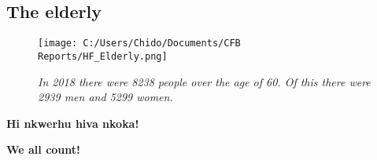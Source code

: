 \documentclass[
]{article}
\begin{document}
\begin{row}
\begin{col-md-4}
\hypertarget{the-elderly}{%
\subsection{The elderly}\label{the-elderly}}

\begin{figure}
\centering
\texttt{[image: C:/Users/Chido/Documents/CFB Reports/HF\_Elderly.png]}
\caption{\emph{In 2018 there were 8238 people over the age of 60. Of
this there were 2939 men and 5299 women.}}
\end{figure}

\end{col-md-4}

\end{row}

\textbf{Hi nkwerhu hiva nkoka!}

\textbf{We all count!}
\end{document}
